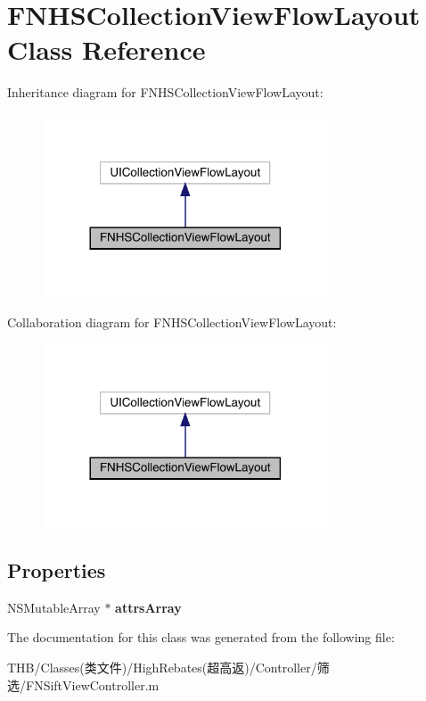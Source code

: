 \hypertarget{interface_f_n_h_s_collection_view_flow_layout}{}\section{F\+N\+H\+S\+Collection\+View\+Flow\+Layout Class Reference}
\label{interface_f_n_h_s_collection_view_flow_layout}


Inheritance diagram for F\+N\+H\+S\+Collection\+View\+Flow\+Layout\+:\nopagebreak
\begin{figure}[H]
\begin{center}
\leavevmode
\includegraphics[width=240pt]{interface_f_n_h_s_collection_view_flow_layout__inherit__graph}
\end{center}
\end{figure}


Collaboration diagram for F\+N\+H\+S\+Collection\+View\+Flow\+Layout\+:\nopagebreak
\begin{figure}[H]
\begin{center}
\leavevmode
\includegraphics[width=240pt]{interface_f_n_h_s_collection_view_flow_layout__coll__graph}
\end{center}
\end{figure}
\subsection*{Properties}
\begin{DoxyCompactItemize}
\item 
\mbox{\label{interface_f_n_h_s_collection_view_flow_layout_adb4a7ca84f06b53228f318a10762d951}} 
N\+S\+Mutable\+Array $\ast$ {\bfseries attrs\+Array}
\end{DoxyCompactItemize}


The documentation for this class was generated from the following file\+:\begin{DoxyCompactItemize}
\item 
T\+H\+B/\+Classes(类文件)/\+High\+Rebates(超高返)/\+Controller/筛选/F\+N\+Sift\+View\+Controller.\+m\end{DoxyCompactItemize}
